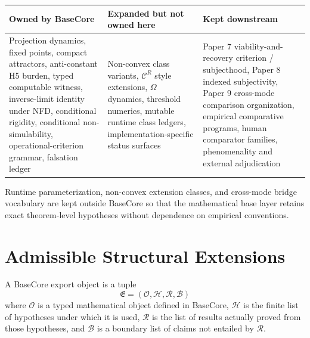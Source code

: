 \begin{center}
\renewcommand{\arraystretch}{1.12}
\begin{tabularx}{\textwidth}{P{0.31\textwidth} P{0.31\textwidth} Y}
\toprule
\textbf{Owned by BaseCore} & \textbf{Expanded but not owned here} & \textbf{Kept downstream} \\
\midrule
Projection dynamics, fixed points, compact attractors, anti-constant H5 burden, typed computable witness, inverse-limit identity under NFD, conditional rigidity, conditional non-simulability, operational-criterion grammar, falsation ledger &
Non-convex class variants, $\mathscr{C}^R$ style extensions, $\Omega$ dynamics, threshold numerics, mutable runtime class ledgers, implementation-specific status surfaces &
Paper 7 viability-and-recovery criterion / subjecthood, Paper 8 indexed subjectivity, Paper 9 cross-mode comparison organization, empirical comparative programs, human comparator families, phenomenality and external adjudication \\
\bottomrule
\end{tabularx}
\end{center}

\begin{remark}
Runtime parameterization, non-convex extension classes, and cross-mode bridge vocabulary are kept outside BaseCore so that the mathematical base layer retains exact theorem-level hypotheses without dependence on empirical conventions.
\end{remark}

\section{Admissible Structural Extensions}

\begin{definition}
A BaseCore export object is a tuple
\[
  \mathfrak{E}=(\mathcal{O},\mathcal{H},\mathcal{R},\mathcal{B})
\]
where $\mathcal{O}$ is a typed mathematical object defined in BaseCore, $\mathcal{H}$ is the finite list of hypotheses under which it is used, $\mathcal{R}$ is the list of results actually proved from those hypotheses, and $\mathcal{B}$ is a boundary list of claims not entailed by $\mathcal{R}$.
\end{definition}


